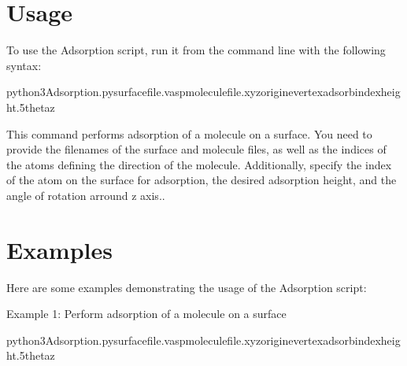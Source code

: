 \documentclass[letterpaper,10pt,english]{sphinxmanual}
\begin{document}
\sphinxstepscope


\section{Usage}
\label{\detokenize{usage:usage}}\label{\detokenize{usage::doc}}
\sphinxAtStartPar
To use the Adsorption script, run it from the command line with the following syntax:

\begin{sphinxVerbatim}[commandchars=\\\{\}]
python3Adsorption.pysurface\PYGZus{}file.vaspmolecule\PYGZus{}file.xyz\PYGZhy{}\PYGZhy{}origine\PYGZhy{}\PYGZhy{}vertex\PYGZhy{}\PYGZhy{}adsorb\PYGZus{}index\PYGZhy{}\PYGZhy{}height.5\PYGZhy{}\PYGZhy{}theta\PYGZus{}z
\end{sphinxVerbatim}

\sphinxAtStartPar
This command performs adsorption of a molecule on a surface. You need to provide the filenames of the surface and molecule files, as well as the indices of the atoms defining the direction of the molecule. Additionally, specify the index of the atom on the surface for adsorption, the desired adsorption height, and the angle of rotation arround z axis..

\sphinxstepscope


\section{Examples}
\label{\detokenize{examples:examples}}\label{\detokenize{examples::doc}}
\sphinxAtStartPar
Here are some examples demonstrating the usage of the Adsorption script:

\sphinxAtStartPar
Example 1: Perform adsorption of a molecule on a surface

\begin{sphinxVerbatim}[commandchars=\\\{\}]
python3Adsorption.pysurface\PYGZus{}file.vaspmolecule\PYGZus{}file.xyz\PYGZhy{}\PYGZhy{}origine\PYGZhy{}\PYGZhy{}vertex\PYGZhy{}\PYGZhy{}adsorb\PYGZus{}index\PYGZhy{}\PYGZhy{}height.5\PYGZhy{}\PYGZhy{}theta\PYGZus{}z
\end{sphinxVerbatim}
\end{document}
